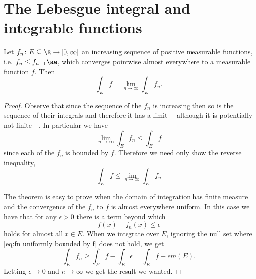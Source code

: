 \documentclass[12pt,oneside]{book}
\begin{document}
\chapter{The Lebesgue integral and integrable functions}
\begin{theorem} \label{theo:monotone convergence}
	Let \( f_n \colon E \subseteq \R \to [0,\infty] \) an increasing sequence of positive
	measurable functions, i.e. \( f_n \leq f_{n+1} \ae \), which converges pointwise almost everywhere to a measurable  function \( f \). Then
	\begin{equation*}
		\int_E f = \lim_{n \to \infty} \int_E f_n.
	\end{equation*}
\end{theorem}
\begin{proof}
	Observe that since the sequence of the \( f_n \) is increasing then so is the sequence
	of their integrals and therefore it has a limit ---although it is potentially not
	finite---. In particular we have
	\begin{equation*}
		\lim_{n \to \infty} \int_E f_n \leq \int_E f
	\end{equation*}
	since each of the \( f_n \) is bounded by \( f \). Therefore we need only show the
	reverse inequality,
	\begin{equation} \label{eq:integral of limit bounded by limit of integrals}
		\int_E f \leq \lim_{n \to \infty} \int_E f_n
	\end{equation}

	The theorem is easy to prove when the domain of integration has finite measure and the
	convergence of the \( f_n \) to \( f \) is almost everywhere uniform. In this case we
	have that for any \( \epsilon > 0 \) there is a term beyond which
	\begin{equation*}\label{eq:fn uniformly bounded by f}
		f(x) - f_n(x) \leq \epsilon
	\end{equation*}
	holds for almost all \( x \in E \). When we integrate over \( E \), ignoring the null
	set where \cref{eq:fn uniformly bounded by f} does not hold, we get
	\begin{equation*}
		\int_E f_n \geq \int_E f - \int_E \epsilon = \int_E f - \epsilon m(E).
	\end{equation*}
	Letting \( \epsilon \to 0 \) and \( n \to \infty \) we get the result we wanted.


\end{proof}
\end{document}
